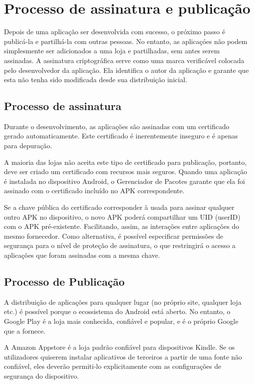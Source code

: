 \documentclass{article}
\begin{document}
\section{Processo de assinatura e publicação}
Depois de uma aplicação ser desenvolvida com sucesso, o próximo passo é publicá-la e partilhá-la com outras pessoas. No entanto, as aplicaçóes não podem simplesmente ser adicionados a uma loja e partilhadas, sem antes serem assinadas.
A assinatura criptográfica serve como uma marca verificável colocada pelo desenvolvedor da aplicação. Ela identifica o autor da aplicação e garante que esta não tenha sido modificada desde sua distribuição inicial.

\subsection{Processo de assinatura}
Durante o desenvolvimento, as aplicações são assinadas com um certificado gerado automaticamente. Este certificado é inerentemente inseguro e é apenas para depuração. 

A maioria das lojas não aceita este tipo de certificado para publicação, portanto, deve ser criado um certificado com recursos mais seguros. Quando uma aplicação é instalada no dispositivo Android, o Gerenciador de Pacotes garante que ela foi assinado com o certificado incluído no APK correspondente. 

Se a chave pública do certificado corresponder à usada para assinar qualquer outro APK no dispositivo, o novo APK poderá compartilhar um UID (userID) com o APK pré-existente. 
Facilitando, assim, as interações entre aplicações do mesmo fornecedor. Como alternativa, é possível especificar permissões de segurança para o nível de proteção de assinatura, o que restringirá o acesso a aplicações que foram assinadas com a mesma chave.


\subsection{Processo de Publicação}
A distribuição de aplicações para qualquer lugar (no próprio site, qualquer loja etc.) é possível porque o ecossistema do Android está aberto. No entanto, o Google Play é a loja mais conhecida, confiável e popular, e é o próprio Google que a fornece. 

A Amazon Appstore é a loja padrão confiável para dispositivos Kindle. Se os utilizadores quiserem instalar aplicativos de terceiros a partir de uma fonte não confiável, eles deverão permiti-lo explicitamente com as configurações de segurança do dispositivo.
\end{document}
